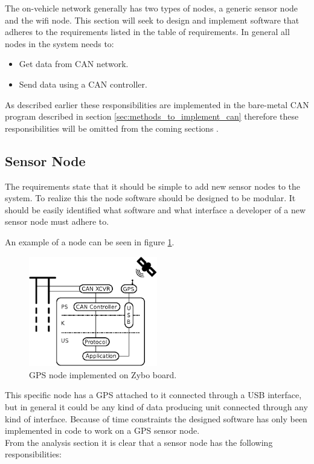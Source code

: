 The on-vehicle network generally has two types of nodes, a generic sensor node and the wifi node.
This section will seek to design and implement software that adheres to the requirements listed in the table of requirements.
In general all nodes in the system needs to:
\begin{itemize}
\item Get data from CAN network.
\item Send data using a CAN controller.
\end{itemize}
As described earlier these responsibilities are implemented in the bare-metal CAN program described in section \ref{sec:methods_to_implement_can} therefore these responsibilities will be omitted from the coming sections .

\subsection{Sensor Node}
\label{sec:sensor_node}
The requirements state that it should be simple to add new sensor nodes to the system. 
To realize this the node software should be designed to be modular.
It should be easily identified what software and what interface a developer of a new sensor node must adhere to.

An example of a node can be seen in figure \ref{fig:gps_node}.


\begin{figure}[!h]
\centering
\includegraphics[width=0.5\textwidth]{graphics/analysis_gps.eps}
\caption{GPS node implemented on Zybo board.}
\label{fig:gps_node}
\end{figure}

This specific node has a GPS attached to it connected through a USB interface, but in general it could be any kind of data producing unit connected through any kind of interface.
Because of time constraints the designed software has only been implemented in code to work on a GPS sensor node.
\\From the analysis section it is clear that a sensor node has the following responsibilities:

